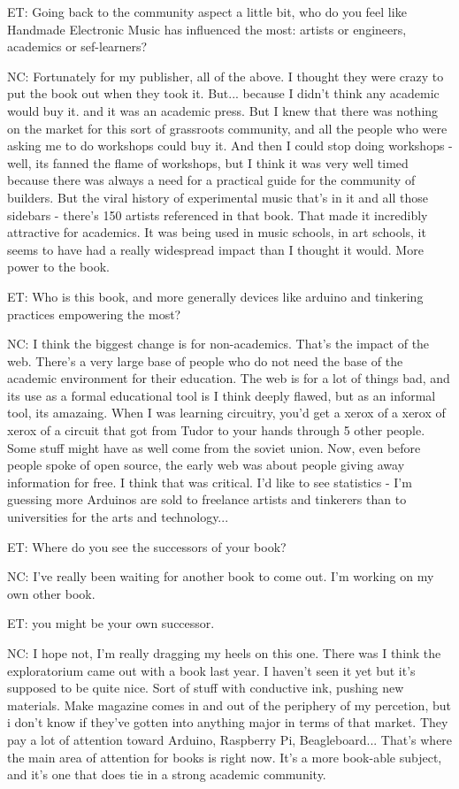 ET: Going back to the community aspect a little bit, who do you feel like Handmade Electronic Music has influenced the most: artists or engineers, academics or sef-learners? 

NC: Fortunately for my publisher, all of the above. I thought they were crazy to put the book out when they took it. But... because I didn't think any academic would buy it. and it was an academic press. But I knew that there was nothing on the market for this sort of grassroots community, and all the people who were asking me to do workshops could buy it. And then I could stop doing workshops - well, its fanned the flame of workshops, but I think it was very well timed because there was always a need for a practical guide for the community of builders. But the viral history of experimental music that's in it and all those sidebars - there's 150 artists referenced in that book. That made it incredibly attractive for academics. It was being used in music schools, in art schools, it seems to have had a really widespread impact than I thought it would. More power to the book. 

ET: Who is this book, and more generally devices like arduino and tinkering practices empowering the most? 

NC: I think the biggest change is for non-academics. That's the impact of the web. There's a very large base of people who do not need the base of the academic environment for their education. The web is for a lot of things bad, and its use as a formal educational tool is I think deeply flawed, but as an informal tool, its amazaing. When I was learning circuitry, you'd get a xerox of a xerox of xerox of a circuit that got from Tudor to your hands through 5 other people. Some stuff might have as well come from the soviet union. Now, even before people spoke of open source, the early web was about people giving away information for free. I think that was critical. I'd like to see statistics - I'm guessing more Arduinos are sold to freelance artists and tinkerers than to universities for the arts and technology... 

ET: Where do you see the successors of your book? 

NC: I've really been waiting for another book to come out. I'm working on my own other book. 

ET: you might be your own successor. 

NC: I hope not, I'm really dragging my heels on this one. There was I think the exploratorium came out with a book last year. I haven't seen it yet but it's supposed to be quite nice. Sort of stuff with conductive ink, pushing new materials. Make magazine comes in and out of the periphery of my percetion, but i don't know if they've gotten into anything major in terms of that market. They pay a lot of attention toward Arduino, Raspberry Pi, Beagleboard... That's where the main area of attention for books is right now. It's a more book-able subject, and it's one that does tie in a strong academic community. 

